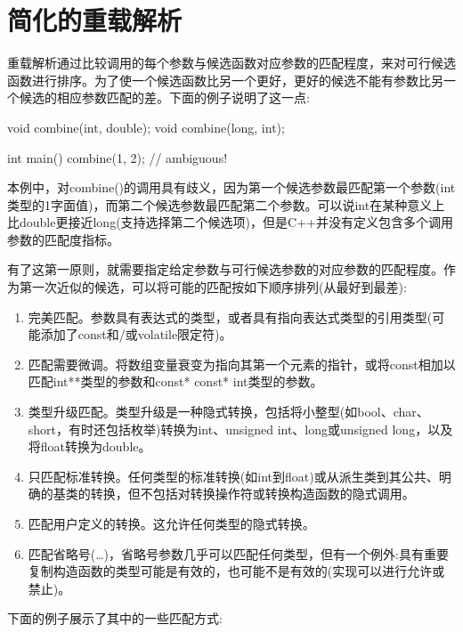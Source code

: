 \section{简化的重载解析}

重载解析通过比较调用的每个参数与候选函数对应参数的匹配程度，来对可行候选函数进行排序。为了使一个候选函数比另一个更好，更好的候选不能有参数比另一个候选的相应参数匹配的差。下面的例子说明了这一点:

\begin{cpp}
void combine(int, double);
void combine(long, int);

int main()
{
	combine(1, 2); // ambiguous!
}
\end{cpp}

本例中，对combine()的调用具有歧义，因为第一个候选参数最匹配第一个参数(int类型的1字面值)，而第二个候选参数最匹配第二个参数。可以说int在某种意义上比double更接近long(支持选择第二个候选项)，但是C++并没有定义包含多个调用参数的匹配度指标。

有了这第一原则，就需要指定给定参数与可行候选参数的对应参数的匹配程度。作为第一次近似的候选，可以将可能的匹配按如下顺序排列(从最好到最差):

\begin{enumerate}
\item 
完美匹配。参数具有表达式的类型，或者具有指向表达式类型的引用类型(可能添加了const和/或volatile限定符)。

\item 
匹配需要微调。将数组变量衰变为指向其第一个元素的指针，或将const相加以匹配int**类型的参数和const* const* int类型的参数。


\item 
类型升级匹配。类型升级是一种隐式转换，包括将小整型(如bool、char、short，有时还包括枚举)转换为int、unsigned int、long或unsigned long，以及将float转换为double。


\item 
只匹配标准转换。任何类型的标准转换(如int到float)或从派生类到其公共、明确的基类的转换，但不包括对转换操作符或转换构造函数的隐式调用。


\item 
匹配用户定义的转换。这允许任何类型的隐式转换。


\item 
匹配省略号(…)，省略号参数几乎可以匹配任何类型，但有一个例外:具有重要复制构造函数的类型可能是有效的，也可能不是有效的(实现可以进行允许或禁止)。
\end{enumerate}

下面的例子展示了其中的一些匹配方式:

